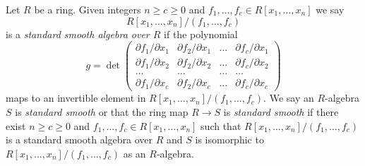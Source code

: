 \begin{definition}
\label{definition-standard-smooth}
Let $R$ be a ring. Given integers $n \geq c \geq 0$ and
$f_1, \ldots, f_c \in R[x_1, \ldots, x_n]$ we say
$$
R[x_1, \ldots, x_n]/(f_1, \ldots, f_c)
$$
is a {\it standard smooth algebra over $R$} if the polynomial
$$
g =
\det
\left(
\begin{matrix}
\partial f_1/\partial x_1 &
\partial f_2/\partial x_1 &
\ldots &
\partial f_c/\partial x_1 \\
\partial f_1/\partial x_2 &
\partial f_2/\partial x_2 &
\ldots &
\partial f_c/\partial x_2 \\
\ldots & \ldots & \ldots & \ldots \\
\partial f_1/\partial x_c &
\partial f_2/\partial x_c &
\ldots &
\partial f_c/\partial x_c
\end{matrix}
\right)
$$
maps to an invertible element in $R[x_1, \ldots, x_n]/(f_1, \ldots, f_c)$.
We say an $R$-algebra $S$ is {\it standard smooth} or that
the ring map $R \to S$ is {\it standard smooth} if there exist
$n \geq c \geq 0$ and $f_1, \ldots, f_c \in R[x_1, \ldots, x_n]$
such that $R[x_1, \ldots, x_n]/(f_1, \ldots, f_c)$ is a standard smooth
algebra over $R$ and $S$ is isomorphic to
$R[x_1, \ldots, x_n]/(f_1, \ldots, f_c)$ as an $R$-algebra.
\end{definition}